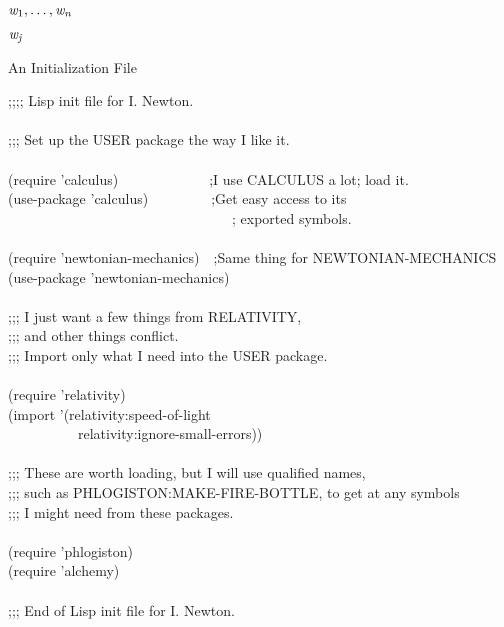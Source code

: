 {\newpage
\clearpage
\samepage ${\it w}_1, \ldots, {\it w}_{\hbox{\scriptsize\it n}}$
}

{\newpage
\clearpage
\samepage ${\it w}_{\hbox{\scriptsize\it j}}$
}

{\newpage
\clearpage
\samepage \begin{table}%
[t]
\caption{An Initialization File}
\label{INIT-FILE-TABLE}
\begin{lisp}
;;;; Lisp init file for I. Newton. \\ 
 \\ 
;;; Set up the USER package the way I like it. \\ 
 \\ 
(require 'calculus)~~~~~~~~~~~~~;I use CALCULUS a lot; load it. \\ 
(use-package 'calculus)~~~~~~~~~;Get easy access to its \\ 
~~~~~~~~~~~~~~~~~~~~~~~~~~~~~~~~; exported symbols. \\ 
 \\ 
(require 'newtonian-mechanics)~~;Same thing for NEWTONIAN-MECHANICS \\ 
(use-package 'newtonian-mechanics) \\ 
 \\ 
;;; I just want a few things from RELATIVITY, \\ 
;;; and other things conflict. \\ 
;;; Import only what I need into the USER package. \\ 
 \\ 
(require 'relativity) \\ 
(import '(relativity:speed-of-light \\ 
~~~~~~~~~~relativity:ignore-small-errors)) \\ 
 \\ 
;;; These are worth loading, but I will use qualified names, \\ 
;;; such as PHLOGISTON:MAKE-FIRE-BOTTLE, to get at any symbols \\ 
;;; I might need from these packages. \\ 
 \\ 
(require 'phlogiston) \\ 
(require 'alchemy) \\ 
 \\ 
;;; End of Lisp init file for I. Newton.
\end{lisp}
\end{table}
}


